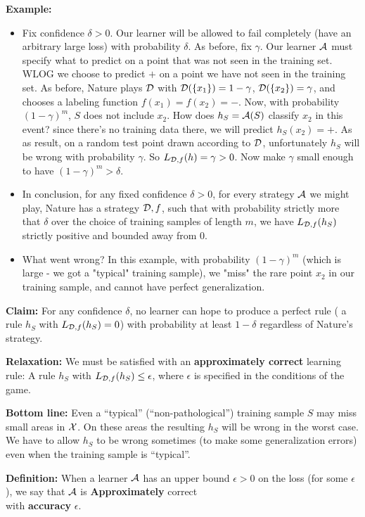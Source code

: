 {	\textbf{Example:}
	\begin{itemize}
		\item Fix confidence $\delta>0$. Our learner will be allowed to fail
		completely (have an arbitrary large loss) with probability $\delta$.
		As before, fix $\gamma$. Our learner $\mathcal{A}$ must specify what to predict on a point that was not seen in the training set. WLOG we choose to predict $+$ on a point we have not seen in the training set. As before, Nature plays $\mathcal{D}$ with
		$\mathcal{D}(\{x_1\}) = 1-\gamma$, $\mathcal{D}(\{x_2\}) = \gamma$, and chooses a labeling function $f(x_1)=f(x_2)=-$. 
		Now, with probability
		$(1-\gamma)^m$, $S$ does not include $x_2$. 
		How does $h_S=\mathcal{A}(S)$
		classify $x_2$ in this event? since there's no training data there, we will predict $h_S(x_2)=+$.
		As as result, on a random test point drawn according to $\mathcal{D}$, unfortunately $h_S$ will be wrong with probability $\gamma$. So
		$L_{\mathcal{D},f}(h)=\gamma>0$. Now make $\gamma$ small enough to have $(1-\gamma)^m > \delta$.
		\item In conclusion, for any fixed confidence $\delta>0$, 
		for every strategy $\mathcal{A}$ we might play, Nature has a strategy $\mathcal{D},f$, such that 
		with probability strictly more that $\delta$ over the choice of training samples of length $m$, we have  
		$L_{\mathcal{D},f}(h_S)$ strictly positive and bounded away from $0$.
		\item What went wrong? In this example, with probability $(1-\gamma)^m$ (which is large - we got a "typical" training sample), we "miss" the rare point $x_2$ in our training sample, and cannot have perfect generalization. 
	\end{itemize}
	
	{\bf Claim:} For any confidence $\delta$, 
	no learner can hope to produce a perfect rule ( a rule $h_S$ with
	$L_{\mathcal{D},f}(h_S) =
	0$) with probability at least $1-\delta$ regardless of  Nature's strategy.
	
	{\bf Relaxation:} We must be satisfied with an {\bf approximately correct}
	learning rule: A rule $h_S$ with $L_{\mathcal{D},f}(h_S) \le
	\epsilon$, where $\epsilon$ is specified in the conditions of the game.
	
	{\bf Bottom line:} Even a ``typical'' (``non-pathological'') training sample $S$ may miss small areas in $\mathcal{X}$. On these areas
	the resulting $h_S$ will be wrong in the worst case. We have to allow $h_S$ to
	be wrong sometimes (to make some generalization errors) even when the training sample is ``typical''.
    
    {\bf Definition:}  When a learner $\mathcal{A}$ has an upper bound $\epsilon>0$ on
	the loss (for some $\epsilon$), we  say that $\mathcal{A}$ is {\bf Approximately}
	correct \\with {\bf accuracy} $\epsilon$.





}
